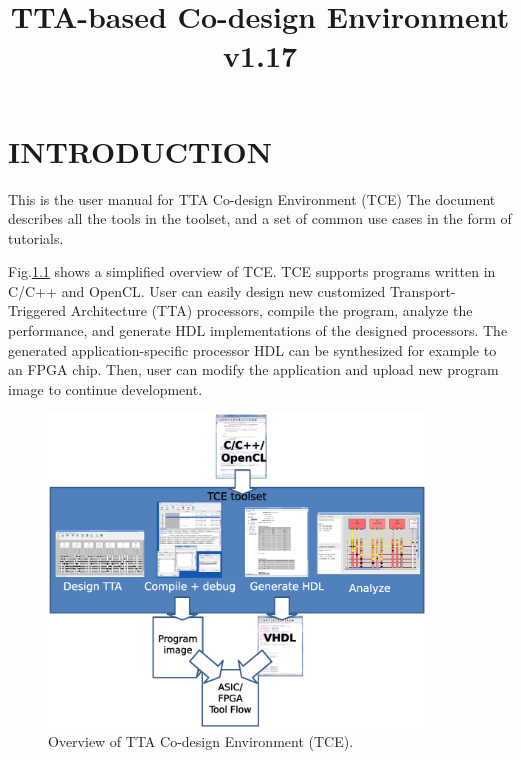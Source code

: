 \documentclass[twoside]{tceusermanual}
\begin{document}
\title{TTA-based Co-design Environment v1.17}
\maketitle

\tableofcontents

\chapter{INTRODUCTION}

This is the user manual for TTA Co-design Environment (TCE)
\cite{tcewww}
The document describes all the tools in the toolset, and a set of common use
cases in the form of tutorials.

Fig.\ref{fig:tce_overview} shows a simplified overview of TCE. TCE supports
programs written in C/C++ and OpenCL. User can easily design new customized
Transport-Triggered Architecture (TTA) processors, compile the program,
analyze the performance, and generate HDL implementations of the designed
processors. The generated application-specific processor HDL can be
synthesized for example to an FPGA chip. Then, user can modify the
application and upload new program image to continue development.

\begin{figure}
  \begin{center}
    \includegraphics[width=10cm]{eps/tce_overview}
    \caption{Overview of TTA Co-design Environment (TCE).}
    \label{fig:tce_overview}
  \end{center}
\end{figure}
\end{document}
